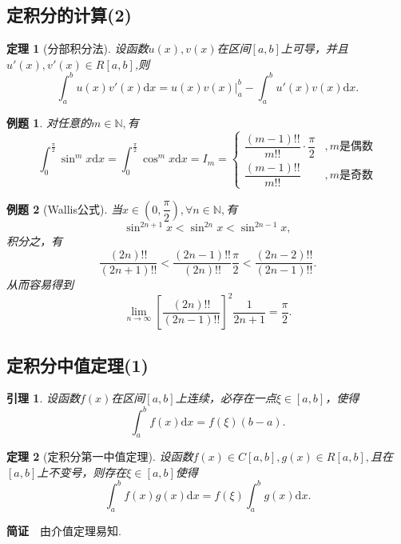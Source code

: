 \documentclass[UTF8]{article}
\newcommand{\dx}{\mathrm{d}x}
\newcommand{\jz}{\textbf{简证}$\quad$}
\newtheorem{thm}{\hspace{2em}定理}[section]
\newtheorem{lem}{\hspace{2em}引理}[section]
\newtheorem{exa}{\hspace{2em}例题}[section]
\begin{document}
\subsection{定积分的计算(2)}
\begin{thm}[分部积分法]
  设函数$u(x),v(x)$在区间$[a,b]$上可导，并且$u'(x),v'(x)\in R[a,b]$,则
  $$\int_a^bu(x)v'(x)\dx=u(x)v(x)\Big|_a^b-\int_a^bu'(x)v(x)\dx.$$
\end{thm}
\begin{exa}
  对任意的$m\in\mathbb{N},$有$$\int_0^\frac{\pi}{2}\sin^mx\dx=\int_0^\frac{\pi}{2}\cos^mx\dx=I_m=
  \begin{cases}
    \dfrac{(m-1)!!}{m!!}\cdot\dfrac{\pi}{2}&,m\text{是偶数}\\
    \dfrac{(m-1)!!}{m!!}&,m\text{是奇数}
  \end{cases}$$
\end{exa}
\begin{exa}[Wallis公式]
  当$x\in\left(0,\dfrac{\pi}{2}\right),\forall n\in\mathbb{N},$有
  $$\sin^{2n+1}x<\sin^{2n}x<\sin^{2n-1}x,$$积分之，有
  $$\frac{(2n)!!}{(2n+1)!!}<\frac{(2n-1)!!}{(2n)!!}\frac{\pi}{2}<\frac{(2n-2)!!}{(2n-1)!!}.$$
  从而容易得到
  $$\lim_{n\to\infty}\left[\frac{(2n)!!}{(2n-1)!!}\right]^2\frac{1}{2n+1}=\frac{\pi}{2}.$$
\end{exa}
\subsection{定积分中值定理(1)}
\begin{lem}
  设函数$f(x)$在区间$[a,b]$上连续，必存在一点$\xi\in[a,b]$，使得
  $$\int_a^bf(x)\dx=f(\xi)(b-a).$$
\end{lem}
\begin{thm}[定积分第一中值定理]
  设函数$f(x)\in C[a,b],g(x)\in R[a,b],$且在$[a,b]$上不变号，则存在$\xi\in[a,b]$使得
  $$\int_a^bf(x)g(x)\dx=f(\xi)\int_a^bg(x)\dx.$$
\end{thm}
\jz 由介值定理易知.
\end{document}

